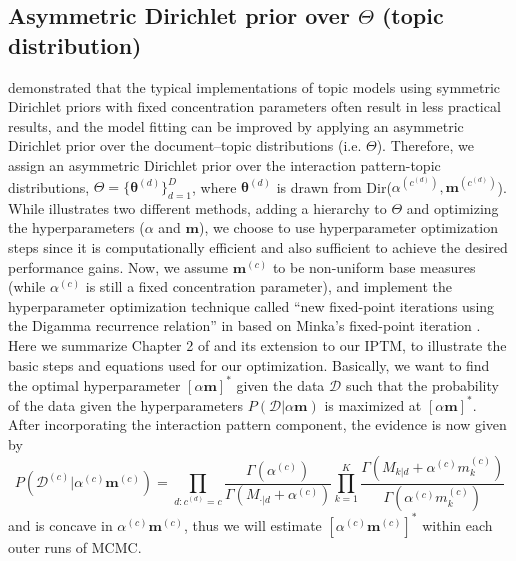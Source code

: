 \documentclass[a4paper]{article}
\begin{document}
\subsection{Asymmetric Dirichlet prior over $\Theta$ (topic distribution)}
\cite{wallach2009rethinking} demonstrated that the typical implementations of topic models using symmetric Dirichlet priors with fixed concentration parameters often result in less practical results, and the model fitting can be improved by applying an asymmetric Dirichlet prior over the document–topic distributions (i.e. $\Theta$). Therefore, we assign an asymmetric Dirichlet prior over the interaction pattern-topic distributions, $\Theta=\{\boldsymbol{\theta}^{(d)} \}_{d=1}^{D}$, where $\boldsymbol{\theta}^{(d)}$ is drawn from Dir($\alpha^{(c^{(d)})}, \boldsymbol{m}^{(c^{(d)})}$). While \cite{wallach2009rethinking} illustrates two different methods, adding a hierarchy to $\Theta$ and optimizing the hyperparameters ($\alpha$ and $\boldsymbol{m}$), we choose to use hyperparameter
optimization steps since it is computationally efficient and also sufficient to achieve the desired performance gains. Now, we assume $\boldsymbol{m}^{(c)}$ to be non-uniform base measures (while $\alpha^{(c)}$ is still a fixed concentration parameter), and implement the hyperparameter optimization technique called ``new fixed-point iterations using the Digamma recurrence relation'' in \cite{wallach2008structured} based on Minka’s fixed-point iteration \citep{minka2000estimating}.\\ \newline
Here we summarize Chapter 2 of \cite{wallach2008structured} and its extension to our IPTM, to illustrate the basic steps and equations used for our optimization. Basically, we want to find the optimal hyperparameter $[\alpha\boldsymbol{m}]^*$ given the data $\mathcal{D}$ such that the probability of the
data given the hyperparameters $P(\mathcal{D}|\alpha\boldsymbol{m})$ is maximized at $[\alpha\boldsymbol{m}]^*$. After incorporating the interaction pattern component, the evidence is now given by 
\begin{equation}
P(\mathcal{D}^{(c)}|\alpha^{(c)}\boldsymbol{m}^{(c)})=\prod_{d:c^{(d)}=c} \frac{\Gamma(\alpha^{(c)})}{\Gamma(M_{\cdot|d}+\alpha^{(c)})}\prod_{k=1}^{K}\frac{\Gamma(M_{k|d}+\alpha^{(c)} m^{(c)}_k)}{\Gamma(\alpha^{(c)} m^{(c)}_k)}
\end{equation} and is concave in $\alpha^{(c)} \boldsymbol{m}^{(c)}$, thus we will estimate $[\alpha^{(c)}\boldsymbol{m}^{(c)}]^*$ within each outer runs of MCMC.\\
\end{document}
